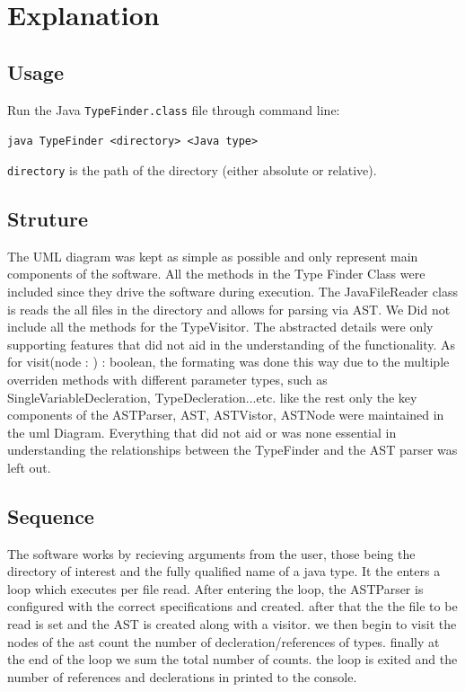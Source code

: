 \documentclass[12p]{article}
\newcommand{\code}[1]{\texttt{#1}}
\begin{document}
\newpage
\onehalfspacing
\section{Explanation}

\subsection{Usage}
Run the Java \code{TypeFinder.class} file through command line:

\code{java TypeFinder <directory> <Java type>}

\code{directory} is the path of the directory (either absolute or relative).

\subsection{Struture}
The UML diagram was kept as simple as possible and only represent main components of the software. All the methods in the Type Finder Class were included since they drive the software during execution. The JavaFileReader class is reads the all files in the directory and allows for parsing via AST. We Did not include all the methods for the TypeVisitor. The abstracted details were only supporting features that did not aid in the understanding of the functionality. As for visit(node : ) : boolean, the formating was done this way due to the multiple overriden methods with different parameter types, such as SingleVariableDecleration, TypeDecleration...etc.
like the rest only the key components of  the ASTParser, AST, ASTVistor, ASTNode were maintained in the uml Diagram. Everything that did not aid or was none essential in understanding the relationships between the TypeFinder and the AST parser was left out.

\subsection{Sequence}
The software works by recieving arguments from the user, those being the directory of interest and the fully qualified name of a java type. It the enters a loop which executes per file read. After entering the loop, the ASTParser is configured with the correct specifications  and created. after that the the file to be read is set and the AST is created along with a visitor. we then begin to visit the nodes of the ast count the number of decleration/references of types. finally at the end of the loop we sum the total number of counts. the loop is exited and the number of references and declerations in printed to the console.
\end{document}
